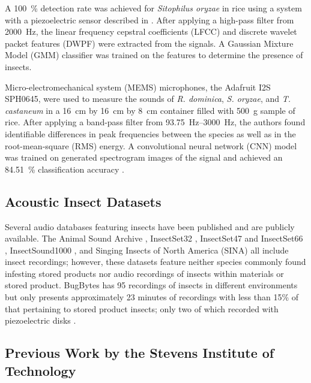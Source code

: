 \documentclass[../Vibro-Acoustic Signatures and Detection Algorithms for Stored Product Insects.tex]{subfiles}
\begin{document}
A \SI{100}{\percent} detection rate was achieved for \textit{Sitophilus oryzae} in rice using a system with a piezoelectric sensor described in \cite{potamitisAutomaticBioacousticDetection2009}. After applying a high-pass filter from \SI{2000}{\hertz}, the linear frequency cepstral coefficients (LFCC) and discrete wavelet packet features (DWPF) were extracted from the signals. A Gaussian Mixture Model (GMM) classifier was trained on the features to determine the presence of insects.

Micro-electromechanical system (MEMS) microphones, the Adafruit I2S SPH0645, were used to measure the sounds of \textit{R. dominica}, \textit{S. oryzae}, and \textit{T. castaneum} in a \SI{16}{\centi\meter} by \SI{16}{\centi\meter} by \SI{8}{\centi\meter} container filled with \SI{500}{\gram} sample of rice. After applying a band-pass filter from \SIrange{93.75}{3000}{\hertz}, the authors found identifiable differences in peak frequencies between the species as well as in the root-mean-square (RMS) energy. A convolutional neural network (CNN) model was trained on generated spectrogram images of the signal and achieved an \SI{84.51}{\percent} classification accuracy  \cite{balingbingDeterminingSoundSignatures2024, balingbingApplicationMultilayerConvolutional2024}.

\newpage
\subsection{Acoustic Insect Datasets}

Several audio databases featuring insects have been published and are publicly available. The Animal Sound Archive \cite{registry-migration.gbif.orgAnimalSoundArchive2016}, InsectSet32 \cite{faissInsectSet32DatasetAutomatic2022}, InsectSet47 and InsectSet66 \cite{faissInsectSet47InsectSet66Expanded2023, faissAdaptiveRepresentationsSound2023}, InsectSound1000 \cite{brandingInsectSound1000InsectSound2024}, and Singing Insects of North America (SINA) \cite{SingingInsectsNorth2024} all include insect recordings; however, these datasets feature neither species commonly found infesting stored products nor audio recordings of insects within materials or stored product. BugBytes has 95 recordings of insects in different environments but only presents approximately 23 minutes of recordings with less than 15\% of that pertaining to stored product insects; only two of which recorded with piezoelectric disks \cite{mankinBugBytesSound2019}.

\subsection{Previous Work by the Stevens Institute of Technology}
\end{document}
